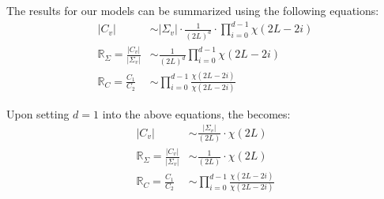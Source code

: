 \documentclass[journal]{IEEEtran}
\begin{document}
The results for our models can be summarized using the following equations:
\begin{align*}
  |C_v| &\sim |\Sigma_v| \cdot \frac{1}{(2L)^d} \cdot \prod_{i=0}^{d-1} \chi (2L-2i) \\ %
  \mathbb{R}_{\Sigma} = \frac{|C_v|}{|\Sigma_v|} &\sim \frac{1}{(2L)^d} \prod^{d-1}_{i=0} \chi(2L-2i) \\ %
\mathbb{R}_{C} = \frac{C_1}{C_2} &\sim \prod_{i=0}^{d-1} \frac{\chi(2L-2i)}{\chi(2L-2i)}
\end{align*}

Upon setting $d=1$ into the above equations,
  the becomes:
\begin{align*}
  |C_v| &\sim  \frac{|\Sigma_v|}{(2L)} \cdot \chi (2L) \\ %
  \mathbb{R}_{\Sigma} = \frac{|C_v|}{|\Sigma_v|} &\sim \frac{1}{(2L)} \cdot \chi(2L) \\ %
\mathbb{R}_{C} = \frac{C_1}{C_2} &\sim \prod_{i=0}^{d-1} \frac{\chi(2L-2i)}{\chi(2L-2i)}
\end{align*}
\end{document}
